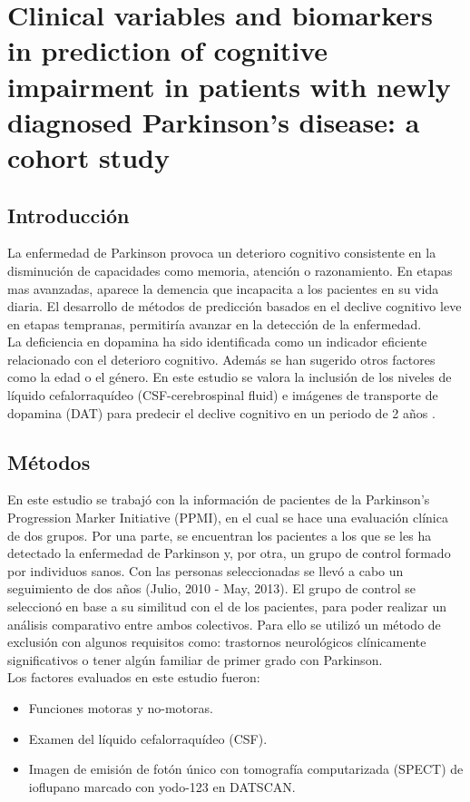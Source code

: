 \section{Clinical variables and biomarkers in prediction of cognitive impairment in patients with newly diagnosed Parkinson’s disease: a cohort study}


\subsection{Introducción}

La enfermedad de Parkinson provoca un deterioro cognitivo consistente en la disminución de capacidades como memoria, atención o razonamiento. En etapas mas avanzadas, aparece la demencia que incapacita a los pacientes en su vida diaria. El desarrollo de métodos de predicción basados en el declive cognitivo leve en etapas tempranas, permitiría avanzar en la detección de la enfermedad. \\


La deficiencia en dopamina ha sido identificada como un indicador eficiente relacionado con el deterioro cognitivo. Además se han sugerido otros factores como la edad o el género. En este estudio se valora la inclusión de los niveles de líquido cefalorraquídeo (CSF-cerebrospinal fluid) e imágenes de transporte de dopamina (DAT) para predecir el declive cognitivo en un periodo de 2 años \cite{schrag2017clinical}.

\subsection{Métodos}
En este estudio se trabajó con la información de pacientes de la Parkinson’s Progression Marker Initiative (PPMI), en el cual se hace una evaluación clínica de dos grupos. Por una parte, se encuentran los pacientes a los que se les ha detectado la enfermedad de Parkinson y, por otra, un grupo de control formado por individuos sanos. Con las personas seleccionadas se llevó a cabo un seguimiento de dos años (Julio, 2010 - May, 2013). El grupo de control se seleccionó en base a su similitud con el de los pacientes, para poder realizar un análisis comparativo entre ambos colectivos. Para ello se utilizó un método de exclusión con algunos requisitos como: trastornos neurológicos clínicamente significativos o tener algún familiar de primer grado con Parkinson.\\

Los factores evaluados en este estudio fueron: 
\begin{itemize}
	\item Funciones motoras y no-motoras.
	\item Examen del líquido cefalorraquídeo (CSF).
	\item Imagen de emisión de fotón único con tomografía computarizada (SPECT) de ioflupano marcado con yodo-123 en DATSCAN.
\end{itemize}

